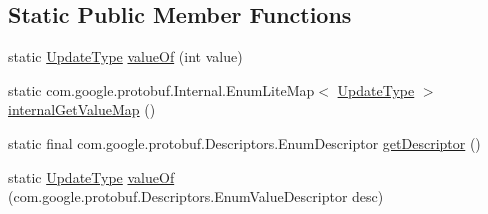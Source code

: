 \subsection*{Static Public Member Functions}
\begin{DoxyCompactItemize}
\item 
static \mbox{\hyperlink{enumcom_1_1mysql_1_1cj_1_1x_1_1protobuf_1_1_mysqlx_crud_1_1_update_operation_1_1_update_type}{Update\+Type}} \mbox{\hyperlink{enumcom_1_1mysql_1_1cj_1_1x_1_1protobuf_1_1_mysqlx_crud_1_1_update_operation_1_1_update_type_a76b3138f10036eebc893804110d6b9cd}{value\+Of}} (int value)
\item 
static com.\+google.\+protobuf.\+Internal.\+Enum\+Lite\+Map$<$ \mbox{\hyperlink{enumcom_1_1mysql_1_1cj_1_1x_1_1protobuf_1_1_mysqlx_crud_1_1_update_operation_1_1_update_type}{Update\+Type}} $>$ \mbox{\hyperlink{enumcom_1_1mysql_1_1cj_1_1x_1_1protobuf_1_1_mysqlx_crud_1_1_update_operation_1_1_update_type_a5f92cd281c1693a61e0f79b88d48be7f}{internal\+Get\+Value\+Map}} ()
\item 
static final com.\+google.\+protobuf.\+Descriptors.\+Enum\+Descriptor \mbox{\hyperlink{enumcom_1_1mysql_1_1cj_1_1x_1_1protobuf_1_1_mysqlx_crud_1_1_update_operation_1_1_update_type_a967d36478ab5e545dbc5238677edab6c}{get\+Descriptor}} ()
\item 
static \mbox{\hyperlink{enumcom_1_1mysql_1_1cj_1_1x_1_1protobuf_1_1_mysqlx_crud_1_1_update_operation_1_1_update_type}{Update\+Type}} \mbox{\hyperlink{enumcom_1_1mysql_1_1cj_1_1x_1_1protobuf_1_1_mysqlx_crud_1_1_update_operation_1_1_update_type_ab342d3f0e8900e8289585a1f06587904}{value\+Of}} (com.\+google.\+protobuf.\+Descriptors.\+Enum\+Value\+Descriptor desc)
\end{DoxyCompactItemize}
